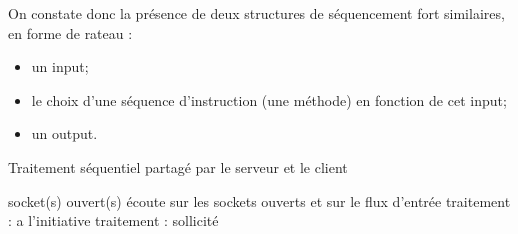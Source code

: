 \documentclass[a4paper,titlepage]{scrreprt}
\begin{document}
 On constate donc la présence de deux structures de séquencement fort similaires, en forme de rateau :
 \begin{itemize}
   \item un input;
   \item le choix d'une séquence d'instruction (une méthode) en fonction de cet input;
   \item un output.
 \end{itemize}
 \begin{algorithm}
  \caption{Traitement séquentiel partagé par le serveur et le client}
  \begin{algorithmic}
  \REQUIRE socket(s) ouvert(s)
  \STATE écoute sur les sockets ouverts et sur le flux d'entrée
  \STATE traitement : a l'initiative
  \STATE traitement : sollicité
  \ENDIF
\end{algorithmic}
\label{pseudo-code-select}
\end{algorithm}
\end{document}
